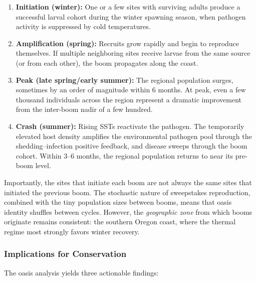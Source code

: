 \begin{enumerate}
  \item \textbf{Initiation (winter):} One or a few sites with surviving adults
    produce a successful larval cohort during the winter spawning season, when
    pathogen activity is suppressed by cold temperatures.
  \item \textbf{Amplification (spring):} Recruits grow rapidly and begin to
    reproduce themselves.  If multiple neighboring sites receive larvae from
    the same source (or from each other), the boom propagates along the coast.
  \item \textbf{Peak (late spring/early summer):} The regional population
    surges, sometimes by an order of magnitude within 6 months.  At peak,
    even a few thousand individuals across the region represent a dramatic
    improvement from the inter-boom nadir of a few hundred.
  \item \textbf{Crash (summer):} Rising SSTs reactivate the pathogen.
    The temporarily elevated host density amplifies the environmental pathogen
    pool through the shedding--infection positive feedback, and disease sweeps
    through the boom cohort.  Within 3--6 months, the regional population
    returns to near its pre-boom level.
\end{enumerate}

Importantly, the sites that initiate each boom are not always the same sites
that initiated the previous boom.  The stochastic nature of sweepstakes
reproduction, combined with the tiny population sizes between booms, means
that oasis identity shuffles between cycles.  However, the \textit{geographic
zone} from which booms originate remains consistent: the southern Oregon
coast, where the thermal regime most strongly favors winter recovery.

\subsubsection{Implications for Conservation}

The oasis analysis yields three actionable findings:

